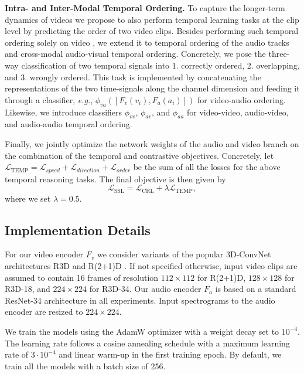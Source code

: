 \documentclass[letterpaper]{article} %
\newcommand{\eg}{\emph{e.g.}}
\begin{document}
\noindent \textbf{Intra- and Inter-Modal Temporal Ordering.}
To capture the longer-term dynamics of videos we propose to also perform temporal learning tasks at the clip level by predicting the order of two video clips.   
Besides performing such temporal ordering solely on video \cite{jenni2021time,xu2019self,kim2019self}, we extend it to temporal ordering of the audio tracks and cross-modal audio-visual temporal ordering. 
Concretely, we pose the three-way classification of two temporal signals into 1. correctly ordered, 2. overlapping, and 3. wrongly ordered. 
This task is implemented by concatenating the representations of the two time-signals along the channel dimension and feeding it through a classifier, \eg, $\phi_{va}([F_v(v_i), F_a(a_i)])$ for video-audio ordering. 
Likewise, we introduce classifiers $\phi_{vv}$, $\phi_{av}$, and $\phi_{aa}$ for video-video, audio-video, and audio-audio temporal ordering. 


Finally, we jointly optimize the network weights of the audio and video branch on the combination of the temporal and contrastive objectives. 
Concretely, let $\mathcal{L}_{\operatorname{TEMP}}=\mathcal{L}_{speed}+\mathcal{L}_{direction}+\mathcal{L}_{order}$ be the sum of all the losses for the above temporal reasoning tasks. 
The final objective is then given by
\begin{equation}
    \mathcal{L}_{\operatorname{SSL}} = \mathcal{L}_{\operatorname{CRL}} + \lambda \mathcal{L}_{\operatorname{TEMP}},
\end{equation}
where we set $\lambda=0.5$.


\subsection{Implementation Details}

For our video encoder $F_v$ we consider variants of the popular 3D-ConvNet architectures R3D \cite{hara2018can} and R(2+1)D \cite{tran2018closer}. 
If not specified otherwise, input video clips are assumed to contain 16 frames of resolution $112\times112$ for R(2+1)D, $128\times128$ for R3D-18,  and $224\times224$ for R3D-34. 
Our audio encoder $F_a$ is based on a standard ResNet-34 \cite{he2016deep} architecture in all experiments. 
Input spectrograms to the audio encoder are resized to $224\times224$. 

We train the models using the AdamW optimizer \cite{loshchilov2018decoupled} with a weight decay set to $10^{-4}$. 
The learning rate follows a cosine annealing schedule \cite{loshchilov2016sgdr} with a maximum learning rate of $3\cdot10^{-4}$ and linear warm-up in the first training epoch. 
By default, we train all the models with a batch size of 256. 
\end{document}
